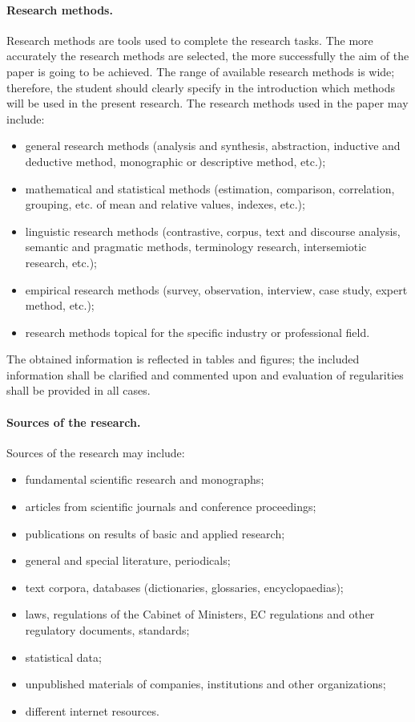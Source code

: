 \paragraph{Research methods.}
Research methods are tools used to complete the research tasks. The more accurately the research methods are selected, the more successfully the aim of the paper is going to be achieved. The range of available research methods is wide; therefore, the student should clearly specify in the introduction which methods will be used in the present research. The research methods used in the paper may include:
\begin{itemize}
  \item general research methods (analysis and synthesis, abstraction, inductive and deductive method, monographic or descriptive method, etc.);
  \item mathematical and statistical methods (estimation, comparison, correlation, grouping, etc. of mean and relative values, indexes, etc.);
  \item linguistic research methods (contrastive, corpus, text and discourse analysis, semantic and pragmatic methods, terminology research, intersemiotic research, etc.);
  \item empirical research methods (survey, observation, interview, case study, expert method, etc.);
  \item research methods topical for the specific industry or professional field.
\end{itemize}

The obtained information is reflected in tables and figures; the included information shall be clarified and commented upon and evaluation of regularities shall be provided in all cases.

\paragraph{Sources of the research.}
Sources of the research may include:
\begin{itemize}
  \item fundamental scientific research and monographs;
  \item articles from scientific journals and conference proceedings;
  \item publications on results of basic and applied research;
  \item general and special literature, periodicals;
  \item text corpora, databases (dictionaries, glossaries, encyclopaedias);
  \item laws, regulations of the Cabinet of Ministers, EC regulations and other regulatory documents, standards;
  \item statistical data;
  \item unpublished materials of companies, institutions and other organizations;
  \item different internet resources.
\end{itemize}

